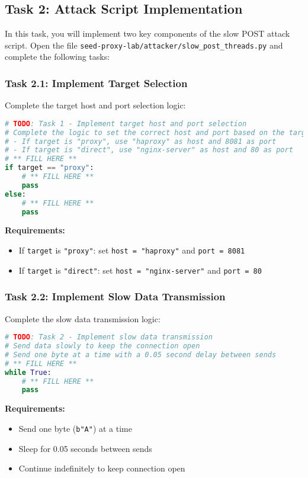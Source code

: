 \documentclass[12pt]{article}
\begin{document}
\subsection{Task 2: Attack Script Implementation}

In this task, you will implement two key components of the slow POST attack script. Open the file \texttt{seed-proxy-lab/attacker/slow\_post\_threads.py} and complete the following tasks:

\subsubsection{Task 2.1: Implement Target Selection}
Complete the target host and port selection logic:

\begin{lstlisting}[language=python, caption=Attack Script - Task 2.1]
# TODO: Task 1 - Implement target host and port selection
# Complete the logic to set the correct host and port based on the target argument
# - If target is "proxy", use "haproxy" as host and 8081 as port
# - If target is "direct", use "nginx-server" as host and 80 as port
# ** FILL HERE **
if target == "proxy":
    # ** FILL HERE **
    pass
else:
    # ** FILL HERE **
    pass
\end{lstlisting}

\textbf{Requirements:}
\begin{itemize}
    \item If \texttt{target} is \texttt{"proxy"}: set \texttt{host = "haproxy"} and \texttt{port = 8081}
    \item If \texttt{target} is \texttt{"direct"}: set \texttt{host = "nginx-server"} and \texttt{port = 80}
\end{itemize}

\subsubsection{Task 2.2: Implement Slow Data Transmission}
Complete the slow data transmission logic:

\begin{lstlisting}[language=python, caption=Attack Script - Task 2.2]
# TODO: Task 2 - Implement slow data transmission
# Send data slowly to keep the connection open
# Send one byte at a time with a 0.05 second delay between sends
# ** FILL HERE **
while True:
    # ** FILL HERE **
    pass
\end{lstlisting}

\textbf{Requirements:}
\begin{itemize}
    \item Send one byte (\texttt{b"A"}) at a time
    \item Sleep for 0.05 seconds between sends
    \item Continue indefinitely to keep connection open
\end{itemize}
\end{document}
